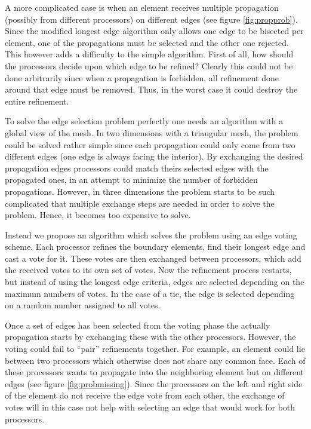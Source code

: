 A more complicated case is when an element receives multiple
propagation (possibly from different processors) on different edges
(see figure \ref{fig:propprob}). Since the modified longest edge
algorithm only allows one edge to be bisected per element, one of the
propagations must be selected and the other one rejected. This however
adds a difficulty to the simple algorithm. First of all, how should
the processors decide upon which edge to be refined? Clearly this
could not be done arbitrarily since when a propagation is forbidden,
all refinement done around that edge must be removed. Thus, in the
worst case it could destroy the entire refinement.

To solve the edge selection problem perfectly one needs an algorithm
with a global view of the mesh. In two dimensions with a triangular
mesh, the problem could be solved rather simple since each propagation
could only come from two different edges (one edge is always facing
the interior). By exchanging the desired propagation edges processors
could match theirs selected edges with the propagated ones, in an
attempt to minimize the number of forbidden propagations. However, in
three dimensions the problem starts to be such complicated that
multiple exchange steps are needed in order to solve the
problem. Hence, it becomes too expensive to solve.

Instead we propose an algorithm which solves the problem using an edge
voting scheme. Each processor refines the boundary elements, find
their longest edge and cast a vote for it. These votes are then
exchanged between processors, which add the received votes to its own
set of votes. Now the refinement process restarts, but instead of
using the longest edge criteria, edges are selected depending on the
maximum numbers of votes. In the case of a tie, the edge is selected
depending on a random number assigned to all votes.

Once a set of edges has been selected from the voting phase the
actually propagation starts by exchanging these with the other
processors. However, the voting could fail to ``pair'' refinements
together. For example, an element could lie between two processors
which otherwise does not share any common face. Each of these
processors wants to propagate into the neighboring element but on
different edges (see figure \ref{fig:probmissing}). Since the
processors on the left and right side of the element do not receive
the edge vote from each other, the exchange of votes will in this case
not help with selecting an edge that would work for both processors.

